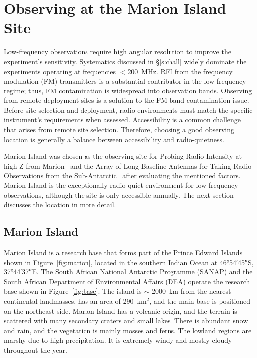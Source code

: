 \chapter{Observing at the Marion Island Site}


Low-frequency observations require high angular resolution to improve the experiment's sensitivity. Systematics discussed in \S\ref{s:chall} widely dominate the experiments operating at frequencies $<$\SI{200}{MHz}. RFI from the frequency modulation (FM) transmitters is a substantial contributor in the low-frequency regime; thus, FM contamination is widespread into observation bands. Observing from remote deployment sites is a solution to the FM band contamination issue. Before site selection and deployment, radio environments must match the specific instrument's requirements when assessed. Accessibility is a common challenge that arises from remote site selection. Therefore, choosing a good observing location is generally a balance between	accessibility and radio-quietness. 

Marion Island was chosen as the observing site for Probing Radio Intensity at high-Z from Marion~\citep[\prizm;][]{2019JAI.....850004P} and the Array of Long Baseline Antennas for Taking Radio Observations from the Sub-Antarctic~\citep[\albatros;][]{2020arXiv200812208C}  after evaluating the mentioned factors. Marion Island is the exceptionally radio-quiet environment for low-frequency observations, although the site is only accessible annually. The next section discusses the location in more detail.

\section{Marion Island}

Marion Island is a research base that forms part of the Prince Edward Islands shown in Figure~\ref{fig:marion}, located in the southern Indian Ocean at \ang{46;54;45}S, \ang{37;44;37}E. The South African National Antarctic Programme (SANAP) and the South African Department of Environmental Affairs (DEA) operate the research base shown in Figure~\ref{fig:base}.  The island is $\sim$ \SI{2000}{\kilo\metre} from the nearest continental landmasses, has an area of 290~km$^2$, and the main base is positioned on the northeast side. Marion Island has a volcanic origin, and the terrain is scattered with many secondary craters and small lakes. There is abundant snow and rain, and the vegetation is mainly mosses and ferns. The lowland regions are marshy due to high precipitation. It is extremely windy and	mostly cloudy throughout the year.


